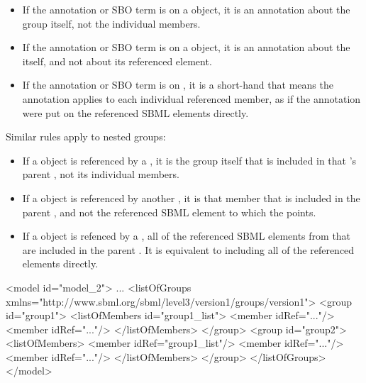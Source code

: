 \begin{itemize}

\item If the annotation or SBO term is on a \Group object, it is an annotation about the group itself, not the individual members.

\item If the annotation or SBO term is on a \Member object, it is an annotation about the \Member itself, and not about its referenced element.

\item If the annotation or SBO term is on \ListOfMembers, it is a short-hand that means the annotation applies to each individual referenced member, as if the annotation were put on the referenced SBML elements directly.

\end{itemize}

Similar rules apply to nested groups:

\begin{itemize}

\item If a \Group object is referenced by a \Member, it is the group itself that is included in that \Member's parent \Group, not its individual members.

\item If a \Member object is referenced by another \Member, it is that member that is included in the parent \Group, and not the referenced SBML element to which the \Member points.

\item If a \ListOfMembers object is refenced by a \Member, all of the referenced SBML elements from that \ListOfMembers are included in the parent \Group.  It is equivalent to including all of the referenced elements directly.

\end{itemize}



\begin{example}
<model id="model_2"> 
  ... 
  <listOfGroups xmlns="http://www.sbml.org/sbml/level3/version1/groups/version1"> 
    <group id="group1"> 
      <listOfMembers id="group1_list"> 
        <member idRef="..."/> 
        <member idRef="..."/> 
      </listOfMembers> 
    </group> 
    <group id="group2"> 
      <listOfMembers> 
        <member idRef="group1_list"/> 
        <member idRef="..."/> 
        <member idRef="..."/> 
      </listOfMembers> 
    </group> 
  </listOfGroups> 
</model> 
\end{example}

